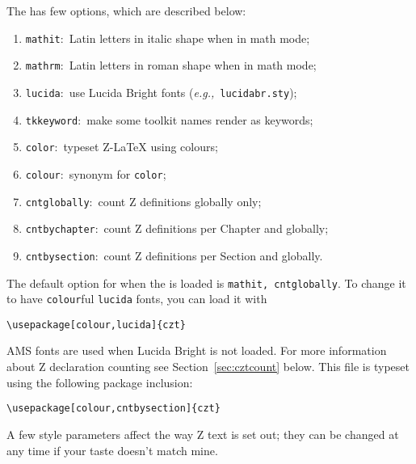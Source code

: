 \documentclass{article}
\begin{document}
The \cztstylefile has few options, which are described below:
%
\begin{enumerate}
   \item \texttt{mathit}:~Latin letters in italic shape when in math mode;
   \item \texttt{mathrm}:~Latin letters in roman shape when in math mode;
   \item \texttt{lucida}:~use Lucida Bright fonts (\textit{e.g.,}~\texttt{lucidabr.sty});
   \item \texttt{tkkeyword}:~make some toolkit names render as keywords;
   \item \texttt{color}:~typeset Z-\LaTeX{} using colours;
   \item \texttt{colour}:~synonym for \texttt{color};
   \item \texttt{cntglobally}:~count Z definitions globally only;
   \item \texttt{cntbychapter}:~count Z definitions per Chapter and globally;
   \item \texttt{cntbysection}:~count Z definitions per Section and globally.
\end{enumerate}
%
The default option for when the \cztstylefile is loaded is \texttt{mathit, cntglobally}.
To change it to have \texttt{colour}ful \texttt{lucida} fonts, you can load it with
%
\begin{verbatim}
\usepackage[colour,lucida]{czt}
\end{verbatim}
%
AMS fonts are used when Lucida Bright is not loaded. For more information about
Z declaration counting see Section~\ref{sec:cztcount} below. This file is typeset
using the following package inclusion:
%
\begin{verbatim}
\usepackage[colour,cntbysection]{czt}
\end{verbatim}

A few style parameters affect the way Z text is set out; they can be
changed at any time if your taste doesn't match mine.
\end{document}
